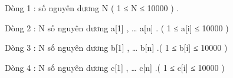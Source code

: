 Dòng 1 : số nguyên dương N ( 1 ≤ N ≤ 10000 ) .   


   Dòng 2 : N số nguyên dương a[1] , … a[n] . ( 1 ≤ a[i] ≤ 10000 )   


   Dòng 3 : N số nguyên dương b[1] , … b[n] .( 1 ≤ b[i] ≤ 10000 )   


   Dòng 4 : N số nguyên dương c[1] , … c[n] .( 1 ≤ c[i] ≤ 10000 )